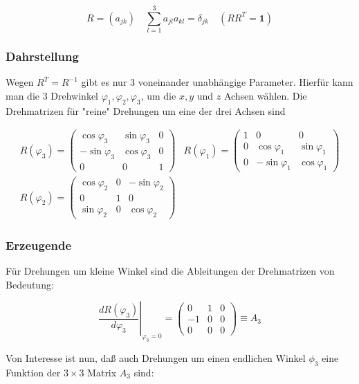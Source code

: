 \documentclass[10pt, letterpaper]{article}
\begin{document}
$$
R=\left(a_{j k}\right) \quad \sum_{l=1}^{3} a_{j l} a_{k l}=\delta_{j k} \quad\left(R R^{T}=\mathbf{1}\right)
$$

\subsubsection*{Dahrstellung}
Wegen $R^{T}=R^{-1}$ gibt es nur 3 voneinander unabhängige Parameter. Hierfür kann man die 3 Drehwinkel $\varphi_{1}, \varphi_{2}, \varphi_{3}$, um die $x, y$ und $z$ Achsen wählen. Die Drehmatrizen für "reine" Drehungen um eine der drei Achsen sind

$$
\begin{array}{ll}
R\left(\varphi_{3}\right)=\left(\begin{array}{ccc}
\cos \varphi_{3} & \sin \varphi_{3} & 0 \\
-\sin \varphi_{3} & \cos \varphi_{3} & 0 \\
0 & 0 & 1
\end{array}\right) & R\left(\varphi_{1}\right)=\left(\begin{array}{ccc}
1 & 0 & 0 \\
0 & \cos \varphi_{1} & \sin \varphi_{1} \\
0 & -\sin \varphi_{1} & \cos \varphi_{1}
\end{array}\right) \\
R\left(\varphi_{2}\right)=\left(\begin{array}{ccc}
\cos \varphi_{2} & 0 & -\sin \varphi_{2} \\
0 & 1 & 0 \\
\sin \varphi_{2} & 0 & \cos \varphi_{2}
\end{array}\right) &
\end{array}
$$

\subsubsection*{Erzeugende}
Für Drehungen um kleine Winkel sind die Ableitungen der Drehmatrizen von Bedeutung:

$$
\left.\frac{d R\left(\varphi_{3}\right)}{d \varphi_{3}}\right|_{\varphi_{3}=0}=\left(\begin{array}{ccc}
0 & 1 & 0 \\
-1 & 0 & 0 \\
0 & 0 & 0
\end{array}\right) \equiv A_{3}
$$

Von Interesse ist nun, daß auch Drehungen um einen endlichen Winkel $\phi_{3}$ eine Funktion der $3 \times 3$ Matrix $A_{3}$ sind:
\end{document}
